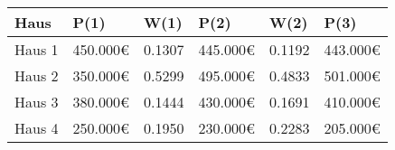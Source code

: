 \begin{tabularx}{\textwidth}{|X|X|X|X|X|X|}
    \hline
    \textbf{Haus} & \textbf{P(1)} & \textbf{W(1)} & \textbf{P(2)} & \textbf{W(2)} & \textbf{P(3)} \\
    \hline
    Haus 1        & 450.000€      & 0.1307        & 445.000€      & 0.1192        & 443.000€      \\
    \hline
    Haus 2        & 350.000€      & 0.5299        & 495.000€      & 0.4833        & 501.000€      \\
    \hline
    Haus 3        & 380.000€      & 0.1444        & 430.000€      & 0.1691        & 410.000€      \\
    \hline
    Haus 4        & 250.000€      & 0.1950        & 230.000€      & 0.2283        & 205.000€      \\
    \hline
\end{tabularx}